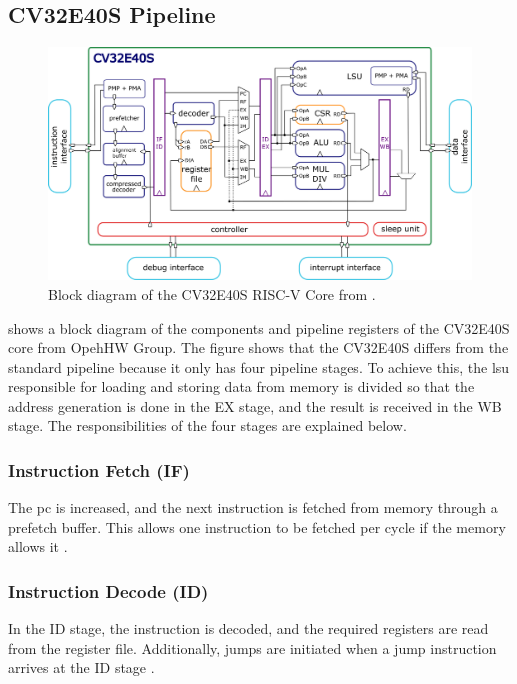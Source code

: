 \subsection{CV32E40S Pipeline}
\label{sec:bg_cv32Pipeline}


\begin{figure}[htb]
    \centering
    \includegraphics[width=0.9\linewidth]{figures/CV32E40S_Block_Diagram.png}
    \caption{Block diagram of the CV32E40S RISC-V Core from \cite{openhwgroupIntroductionCOREVCV32E40S2023}.}
    \label{fig:cv32e40s-block}
\end{figure}

 shows a block diagram of the components and pipeline registers of the CV32E40S core from OpehHW Group.
The figure shows that the CV32E40S differs from the standard pipeline because it only has four pipeline stages. To achieve this, the \acrlong{lsu} responsible for loading and storing data from memory is divided so that the address generation is done in the EX stage, and the result is received in the WB stage.
The responsibilities of the four stages are explained below.

\subsubsection{Instruction Fetch (IF)}

The \acrfull{pc} is increased, and the next instruction is fetched from memory through a prefetch buffer. This allows one instruction to be fetched per cycle if the memory allows it \cite{openhwgroupPipelineDetailsCOREV2023}.

\subsubsection{Instruction Decode (ID)}

In the ID stage, the instruction is decoded, and the required registers are read from the register file. Additionally, jumps are initiated when a jump instruction arrives at the ID stage \cite{openhwgroupPipelineDetailsCOREV2023}. 


